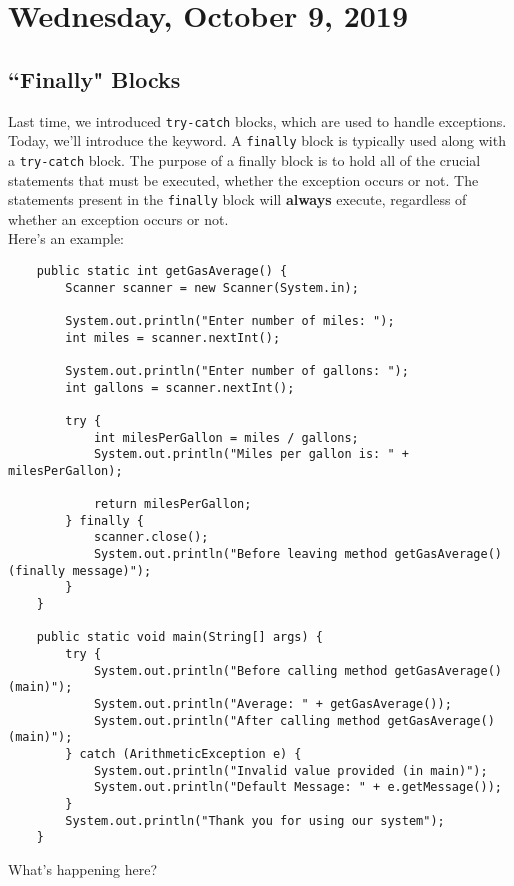 \section{Wednesday, October 9, 2019}


\subsection{``Finally" Blocks}

Last time, we introduced \verb!try-catch! blocks, which are used to handle exceptions. Today, we'll introduce the  keyword. A \verb!finally! block is typically used along with a \verb!try-catch! block. The purpose of a finally block is to hold all of the crucial statements that must be executed, whether the exception occurs or not. The statements present in the \verb!finally! block will \textbf{always} execute, regardless of whether an exception occurs or not. \\

\noindent Here's an example:

\begin{lstlisting}
	public static int getGasAverage() {
		Scanner scanner = new Scanner(System.in);

		System.out.println("Enter number of miles: ");
		int miles = scanner.nextInt();

		System.out.println("Enter number of gallons: ");
		int gallons = scanner.nextInt();

		try {
			int milesPerGallon = miles / gallons;
			System.out.println("Miles per gallon is: " + milesPerGallon);
			
			return milesPerGallon;
		} finally {
			scanner.close();
			System.out.println("Before leaving method getGasAverage() (finally message)");
		}
	}

	public static void main(String[] args) {
		try {
			System.out.println("Before calling method getGasAverage() (main)");
			System.out.println("Average: " + getGasAverage());
			System.out.println("After calling method getGasAverage() (main)");
		} catch (ArithmeticException e) {
			System.out.println("Invalid value provided (in main)");
			System.out.println("Default Message: " + e.getMessage());
		}
		System.out.println("Thank you for using our system");
	}
\end{lstlisting}

What's happening here?

